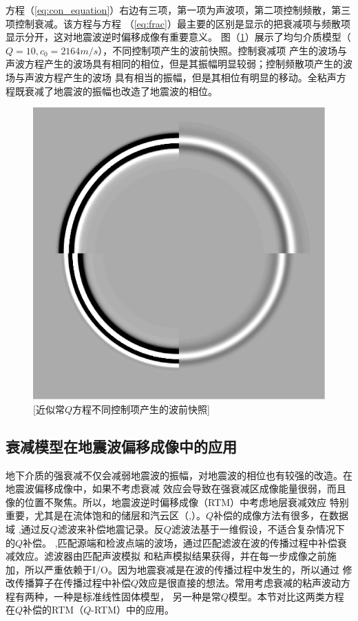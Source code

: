 方程（\ref{eq:con_equation}）右边有三项，第一项为声波项，第二项控制频散，第三项控制衰减。该方程与方程
（\ref{eq:frac}）最主要的区别是显示的把衰减项与频散项显示分开，这对地震波逆时偏移成像有重要意义。
图（\ref{fig:wave_frac}）展示了均匀介质模型（$Q=10,c_0=2164m/s$），不同控制项产生的波前快照。控制衰减项
产生的波场与声波方程产生的波场具有相同的相位，但是其振幅明显较弱；控制频散项产生的波场与声波方程产生的波场
具有相当的振幅，但是其相位有明显的移动。全粘声方程既衰减了地震波的振幅也改造了地震波的相位。
\begin{figure}[!htbp]
	    \centering
		\includegraphics[width=0.5\linewidth]{figure/wave_frac}
		[近似常$Q$方程不同控制项产生的波前快照]
		\label{fig:wave_frac}
\end{figure}


\vspace{0.5cm}
\subsection{衰减模型在地震波偏移成像中的应用}
地下介质的强衰减不仅会减弱地震波的振幅，对地震波的相位也有较强的改造。在地震波偏移成像中，如果不考虑衰减
效应会导致在强衰减区成像能量很弱，而且像的位置不聚焦。所以，地震波逆时偏移成像（RTM）中考虑地层衰减效应
特别重要，尤其是在流体饱和的储层和汽云区（,）。$Q$补偿的成像方法有很多，在数据域
,通过反$Q$滤波来补偿地震记录。反$Q$滤波法基于一维假设，不适合复杂情况下的$Q$补偿。
,匹配源端和检波点端的波场，通过匹配滤波在波的传播过程中补偿衰减效应。滤波器由匹配声波模拟
和粘声模拟结果获得，并在每一步成像之前施加，所以严重依赖于I/O。因为地震衰减是在波的传播过程中发生的，所以通过
修改传播算子在传播过程中补偿$Q$效应是很直接的想法。常用考虑衰减的粘声波动方程有两种，一种是标准线性固体模型，
另一种是常$Q$模型。本节对比这两类方程在$Q$补偿的RTM（$Q$-RTM）中的应用。


